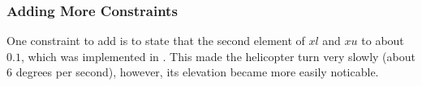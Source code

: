 \subsubsection{Adding More Constraints}
One constraint to add is to state that the second element of $xl$ and $xu$ to about $0.1$, which was implemented in . This made the helicopter turn very slowly (about 6 degrees per second), however, its elevation became more easily noticable.
